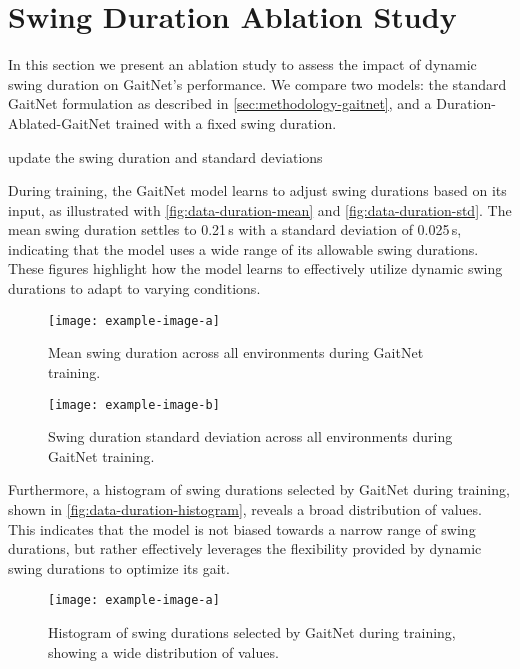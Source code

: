 \section{Swing Duration Ablation Study}
\label{sec:results-swing-ablation-study}

In this section we present an ablation study to assess the impact of
dynamic swing duration on GaitNet's performance. We compare two
models: the standard GaitNet formulation as described in
\autoref{sec:methodology-gaitnet}, and a Duration-Ablated-GaitNet trained
with a fixed swing duration.

\begin{todo}
  update the swing duration and standard deviations
\end{todo}

During training, the GaitNet model learns to adjust swing durations
based on its input, as illustrated with
\autoref{fig:data-duration-mean} and \autoref{fig:data-duration-std}.
The mean swing duration settles to 0.21\,s with a standard deviation
of 0.025\,s, indicating that the model uses a wide range of its
allowable swing durations. These figures highlight how the model
learns to effectively utilize dynamic swing durations to adapt to
varying conditions.

\begin{figure}[H]
  \centering
  \begin{minipage}[T]{0.45\textwidth}
    \centering
    \texttt{[image: example-image-a]}
    \caption{Mean swing duration across all environments during
    GaitNet training.}
    \label{fig:data-duration-mean}
  \end{minipage}
  \hfill
  \begin{minipage}[T]{0.45\textwidth}
    \centering
    \texttt{[image: example-image-b]}
    \caption{Swing duration standard deviation across all
    environments during GaitNet training.}
    \label{fig:data-duration-std}
  \end{minipage}
  \hfill
\end{figure}

Furthermore, a histogram of swing durations selected by GaitNet
during training, shown in \autoref{fig:data-duration-histogram},
reveals a broad distribution of values. This indicates that the model
is not biased towards a narrow range of swing durations, but rather
effectively leverages the flexibility provided by dynamic swing
durations to optimize its gait.

\begin{figure}[H]
  \centering
  \texttt{[image: example-image-a]}
  \caption{Histogram of swing durations selected by GaitNet
  during training, showing a wide distribution of values.}
  \label{fig:data-duration-histogram}
\end{figure}

